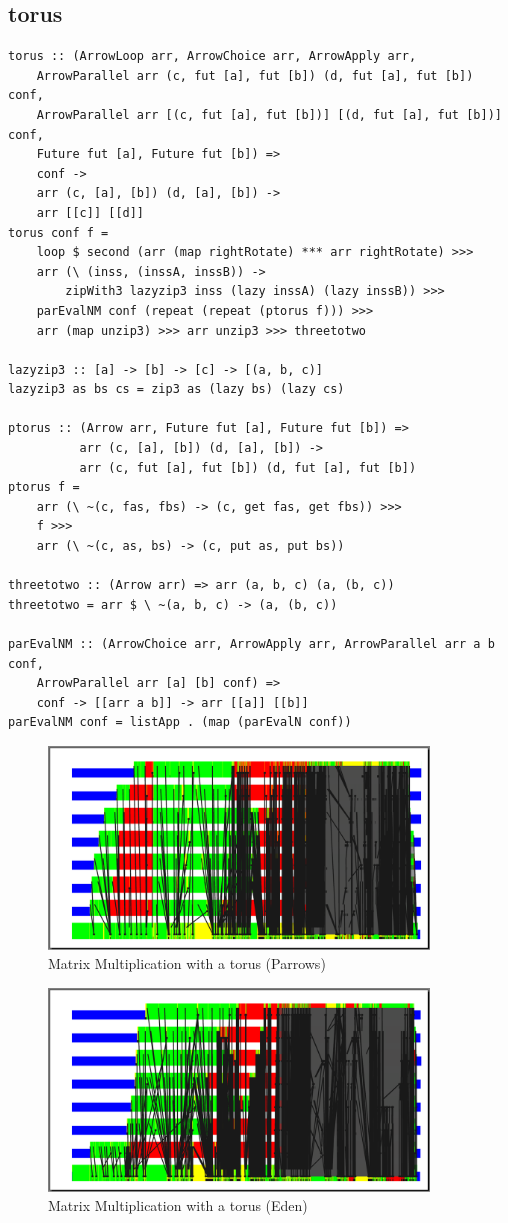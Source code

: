 \subsection{torus}

\begin{lstlisting}[frame=htrbl]
torus :: (ArrowLoop arr, ArrowChoice arr, ArrowApply arr,
    ArrowParallel arr (c, fut [a], fut [b]) (d, fut [a], fut [b]) conf,
    ArrowParallel arr [(c, fut [a], fut [b])] [(d, fut [a], fut [b])] conf,
    Future fut [a], Future fut [b]) =>
	conf ->
	arr (c, [a], [b]) (d, [a], [b])	->
	arr [[c]] [[d]]
torus conf f =
	loop $ second (arr (map rightRotate) *** arr rightRotate) >>>
	arr (\ (inss, (inssA, inssB)) ->
		zipWith3 lazyzip3 inss (lazy inssA) (lazy inssB)) >>>
	parEvalNM conf (repeat (repeat (ptorus f))) >>>
	arr (map unzip3) >>> arr unzip3 >>> threetotwo

lazyzip3 :: [a] -> [b] -> [c] -> [(a, b, c)]
lazyzip3 as bs cs = zip3 as (lazy bs) (lazy cs)

ptorus :: (Arrow arr, Future fut [a], Future fut [b]) =>
          arr (c, [a], [b]) (d, [a], [b]) ->
          arr (c, fut [a], fut [b]) (d, fut [a], fut [b])
ptorus f =
	arr (\ ~(c, fas, fbs) -> (c, get fas, get fbs)) >>>
	f >>>
	arr (\ ~(c, as, bs) -> (c, put as, put bs))

threetotwo :: (Arrow arr) => arr (a, b, c) (a, (b, c))
threetotwo = arr $ \ ~(a, b, c) -> (a, (b, c))

parEvalNM :: (ArrowChoice arr, ArrowApply arr, ArrowParallel arr a b conf,
	ArrowParallel arr [a] [b] conf) =>
	conf -> [[arr a b]] -> arr [[a]] [[b]]
parEvalNM conf = listApp . (map (parEvalN conf))
\end{lstlisting}

\begin{figure}[ht]
	\centering
	\includegraphics[width=0.9\textwidth]{images/torus_matrix_parrows}
	\caption[without Futures]{Matrix Multiplication with a torus (Parrows)}
\end{figure}

\begin{figure}[ht]
	\centering
	\includegraphics[width=0.9\textwidth]{images/torus_matrix_eden}
	\caption[with Futures]{Matrix Multiplication with a torus (Eden)}
\end{figure}